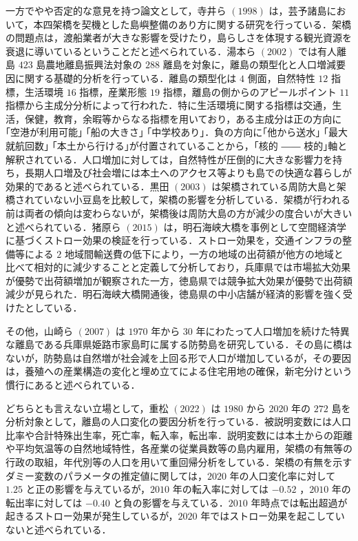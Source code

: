 一方でやや否定的な意見を持つ論文として，寺井ら \((1998)\)
は，芸予諸島において，本四架橋を契機とした島嶼整備のあり方に関する研究を行っている．架橋の問題点は，渡船業者が大きな影響を受けたり，島らしさを体現する観光資源を衰退に導いているということだと述べられている．湯本ら
\((2002)\) では有人離島 \(423\) 島農地離島振興法対象の \(288\)
離島を対象に，離島の類型化と人口増減要因に関する基礎的分析を行っている．離島の類型化は
\(4\) 側面，自然特性 \(12\) 指標，生活環境 \(16\) 指標，産業形態 \(19\)
指標，離島の側からのアピールポイント \(11\)
指標から主成分分析によって行われた．特に生活環境に関する指標は交通，生活，保健，教育，余暇等からなる指標を用いており，ある主成分は正の方向に｢空港が利用可能｣
｢船の大きさ｣ ｢中学校あり｣．負の方向に｢他から送水｣ ｢最大就航回数｣
｢本土から行ける｣が付置されていることから，｢核的 ――
枝的｣軸と解釈されている．人口増加に対しては，自然特性が圧倒的に大きな影響力を持ち，長期人口増及び社会増には本土へのアクセス等よりも島での快適な暮らしが効果的であると述べられている．黒田
\((2003)\)
は架橋されている周防大島と架橋されていない小豆島を比較して，架橋の影響を分析している．架橋が行われる前は両者の傾向は変わらないが，架橋後は周防大島の方が減少の度合いが大きいと述べられている．猪原ら
\((2015)\)
は，明石海峡大橋を事例として空間経済学に基づくストロー効果の検証を行っている．ストロー効果を，交通インフラの整備等による
\(2\)
地域間輸送費の低下により，一方の地域の出荷額が他方の地域と比べて相対的に減少することと定義して分析しており，兵庫県では市場拡大効果が優勢で出荷額増加が観察された一方，徳島県では競争拡大効果が優勢で出荷額減少が見られた．明石海峡大橋開通後，徳島県の中小店舗が経済的影響を強く受けたとしている．

その他，山崎ら \((2007)\) は \(1970\) 年から \(30\)
年にわたって人口増加を続けた特異な離島である兵庫県姫路市家島町に属する防勢島を研究している．その島に橋はないが，防勢島は自然増が社会減を上回る形で人口が増加しているが，その要因は，養殖への産業構造の変化と埋め立てによる住宅用地の確保，新宅分けという慣行にあると述べられている．

どちらとも言えない立場として，重松 \((2022)\) は \(1980\) から \(2020\)
年の \(272\)
島を分析対象として，離島の人口変化の要因分析を行っている．被説明変数には人口比率や合計特殊出生率，死亡率，転入率，転出率．説明変数には本土からの距離や平均気温等の自然地域特性，各産業の従業員数等の島内雇用，架橋の有無等の行政の取組，年代別等の人口を用いて重回帰分析をしている．架橋の有無を示すダミー変数のパラメータの推定値に関しては，\(2020\)
年の人口変化率に対して \(1.25\) と正の影響を与えているが，\(2010\)
年の転入率に対しては \(-0.52\) ，\(2010\) 年の転出率に対しては \(-0.40\)
と負の影響を与えている．\(2010\)
年時点では転出超過が起きるストロー効果が発生しているが，\(2020\)
年ではストロー効果を起こしていないと述べられている．

